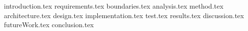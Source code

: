 

{introduction.tex}
{requirements.tex}
{boundaries.tex}
{analysis.tex}
{method.tex}
{architecture.tex}
{design.tex}
{implementation.tex}
{test.tex}
{results.tex}
{discussion.tex}
{futureWork.tex}
{conclusion.tex}

%
